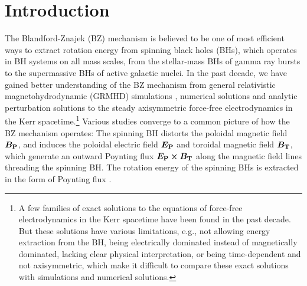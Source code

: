 \documentclass[iop,apj]{emulateapj}
\begin{document}

\bigskip\bigskip

\section{Introduction}
The Blandford-Znajek (BZ) mechanism \citep{Blandford1977} is believed to be one of most efficient ways
to extract rotation energy from spinning black holes (BHs), which operates in BH
systems on all mass scales, from the stellar-mass BHs of gamma ray bursts to the
supermassive BHs of active galactic nuclei. In the past decade, we have gained
better understanding of the BZ mechanism from general relativistic
magnetohydrodynamic (GRMHD) simulations \citep[e.g.][]{Komissarov2001, Komissarov2004e,
Komissarov2004, Komissarov2005, Semenov2004, McKinney2004, McKinney2005, McKinney2007a,
McKinney2007b, Komissarov2007, Tchekhovskoy2008, Tchekhovskoy2010, Tchekhovskoy2011,
Nagataki2009, Nagataki2011, Palenzuela2011, Alic2012, Tchekhovskoy2012, Penna2013, McKinney2013}, numerical
solutions \citep[e.g.][]{Fendt1997, Udensky2004, Udensky2005, Palenzuela2010,
Contopoulos2013, Nathanail2014} and analytic perturbation solutions \citep[e.g.][]{Tanabe2008,
Beskin2013, Pan2014, Pan2015b, Pan2015, Pan2016, Gralla2014, Gralla2015, Gralla2016a,
Yang2015, Penna2015} to the steady axisymmetric force-free electrodynamics in the Kerr
spacetime.\footnote{A few families of exact solutions \citep[e.g.][]{Menon2005, Menon2007,
Menon2011, Brennan2013, Menon2015, Compere2016} to the equations of force-free electrodynamics
in the Kerr spacetime  have been found in the past decade. But these solutions
have various limitations, e.g., not allowing energy extraction from the BH,
being electrically dominated instead of magnetically dominated, lacking clear
physical interpretation, or being time-dependent and not axisymmetric, which
make it difficult to compare these exact solutions with simulations and
numerical solutions.} Various studies converge to a common picture of how the BZ mechanism operates:
The spinning BH distorts the poloidal magnetic field $\bm{B_{\rm P}}$, and induces the poloidal electric field $\bm{E_{\rm P}}$
and toroidal magnetic field $\bm{B_{\rm T}}$,
which generate an outward Poynting flux $\bm{E_{\rm P}
\times B_{\rm T} }$  along the magnetic field lines threading the spinning BH.
The rotation energy of the spinning BHs is extracted in the form of Poynting flux
\citep{Komissarov2009, Beskin2010}.
\end{document}
